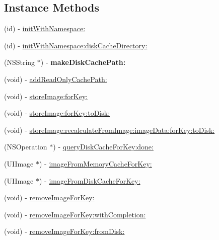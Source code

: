\subsection*{Instance Methods}
\begin{DoxyCompactItemize}
\item 
(id) -\/ \mbox{\hyperlink{interface_s_d_image_cache_a586dcc0a4f8b68e5866b8d2c7bdce7db}{init\+With\+Namespace\+:}}
\item 
(id) -\/ \mbox{\hyperlink{interface_s_d_image_cache_a92cb9299f37364e27e59f5379b076e05}{init\+With\+Namespace\+:disk\+Cache\+Directory\+:}}
\item 
\mbox{\label{interface_s_d_image_cache_a48625e7237af6b6b4cc6c52ee8a661b0}} 
(N\+S\+String $\ast$) -\/ {\bfseries make\+Disk\+Cache\+Path\+:}
\item 
(void) -\/ \mbox{\hyperlink{interface_s_d_image_cache_a9bfedcc9878284b76502287b4b16c1a6}{add\+Read\+Only\+Cache\+Path\+:}}
\item 
(void) -\/ \mbox{\hyperlink{interface_s_d_image_cache_a28d995cab90e214dc5603403a7ed7753}{store\+Image\+:for\+Key\+:}}
\item 
(void) -\/ \mbox{\hyperlink{interface_s_d_image_cache_a558ee696fd5cb48edb05da606701fcec}{store\+Image\+:for\+Key\+:to\+Disk\+:}}
\item 
(void) -\/ \mbox{\hyperlink{interface_s_d_image_cache_a1724c0d0a91b64a097ec63a9934073bd}{store\+Image\+:recalculate\+From\+Image\+:image\+Data\+:for\+Key\+:to\+Disk\+:}}
\item 
(N\+S\+Operation $\ast$) -\/ \mbox{\hyperlink{interface_s_d_image_cache_a55f77fe338c314178df36dc68a4995fd}{query\+Disk\+Cache\+For\+Key\+:done\+:}}
\item 
(U\+I\+Image $\ast$) -\/ \mbox{\hyperlink{interface_s_d_image_cache_abe13b43b333bbb5bbe56142b8d573bd2}{image\+From\+Memory\+Cache\+For\+Key\+:}}
\item 
(U\+I\+Image $\ast$) -\/ \mbox{\hyperlink{interface_s_d_image_cache_ad3502d702952c60cd046ba4e7cba0197}{image\+From\+Disk\+Cache\+For\+Key\+:}}
\item 
(void) -\/ \mbox{\hyperlink{interface_s_d_image_cache_a1d6ca2afef59216e0cb1740d431833cf}{remove\+Image\+For\+Key\+:}}
\item 
(void) -\/ \mbox{\hyperlink{interface_s_d_image_cache_add965b440292c9da74fc85b395a9812a}{remove\+Image\+For\+Key\+:with\+Completion\+:}}
\item 
(void) -\/ \mbox{\hyperlink{interface_s_d_image_cache_a61cf4a9222043f0b302b8fdb0b522e3f}{remove\+Image\+For\+Key\+:from\+Disk\+:}}

\end{DoxyCompactItemize}

